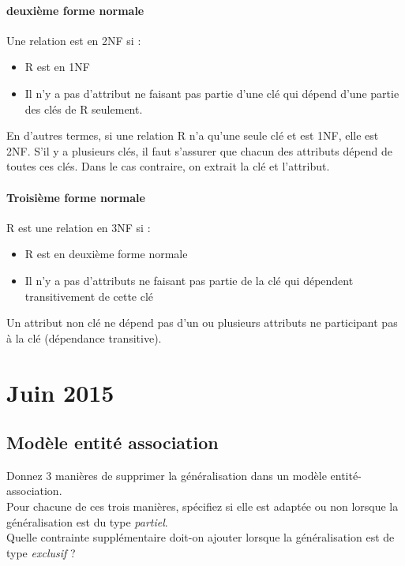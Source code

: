 \paragraph{deuxième forme normale}
Une relation est en 2NF si : 
\begin{itemize}
	\item R est en 1NF
	\item Il n'y a pas d'attribut ne faisant pas partie d'une clé qui dépend 
	d'une partie des clés de R seulement.
\end{itemize}
En d'autres termes, si une relation R n'a qu'une seule clé et est 1NF, 
elle est 2NF. S'il y a plusieurs clés, il faut s'assurer que chacun des attributs 
dépend de toutes ces clés. Dans le cas contraire, on extrait la clé et l'attribut.


\paragraph{Troisième forme normale}
R est une relation en 3NF si : 
\begin{itemize}
	\item R est en deuxième forme normale
	\item Il n'y a pas d'attributs ne faisant pas partie de la clé qui dépendent 
	transitivement de cette clé
\end{itemize}

Un attribut non clé ne dépend pas d'un ou plusieurs attributs ne participant pas à la clé (dépendance transitive).

\section{Juin 2015}

\subsection{Modèle entité association }

Donnez 3 manières de supprimer la généralisation dans un modèle entité-association.\\
Pour chacune de ces trois manières, spécifiez si elle est adaptée ou non lorsque la 
généralisation est du type \textit{partiel}.\\
Quelle contrainte supplémentaire doit-on ajouter lorsque la généralisation est 
de type \textit{exclusif} ?

